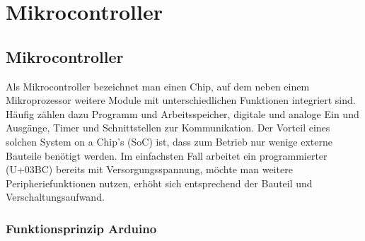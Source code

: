 %
%


\chapter{Mikrocontroller}

\section{Mikrocontroller}

Als Mikrocontroller bezeichnet man einen Chip, auf dem neben einem Mikroprozessor weitere Module mit unterschiedlichen Funktionen integriert sind. Häufig zählen dazu Programm und Arbeitsspeicher, digitale und analoge Ein und Ausgänge, Timer und Schnittstellen zur Kommunikation. Der Vorteil eines solchen System on a Chip's (SoC) ist, dass zum Betrieb nur wenige externe Bauteile benötigt werden. Im einfachsten Fall arbeitet ein programmierter (U+03BC) bereits mit Versorgungsspannung, möchte man weitere Peripheriefunktionen nutzen, erhöht sich entsprechend der Bauteil und Verschaltungsaufwand.\cite{Walter:2010}


\subsection{Funktionsprinzip Arduino}

